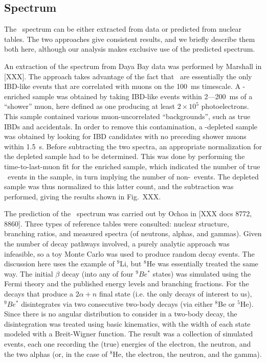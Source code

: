 \documentclass[../thesis.tex]{subfiles}
\begin{document}
\subsection{Spectrum}
\label{sec:bkgLi9Spectrum}

The \LiHe\ spectrum can be either extracted from data or predicted from nuclear tables. The two approaches give consistent results, and we briefly describe them both here, although our analysis makes exclusive use of the predicted spectrum.

An extraction of the spectrum from Daya Bay data was performed by Marshall in [XXX]. The approach takes advantage of the fact that \LiHe\ are essentially the only IBD-like events that are correlated with muons on the 100~ms timescale. A \LiHe-enriched sample was obtained by taking IBD-like events within 2---200~ms of a ``shower'' muon, here defined as one producing at least $2\times10^5$ photoelectrons. This sample contained various muon-uncorrelated ``backgrounds'', such as true IBDs and accidentals. In order to remove this contamination, a \LiHe-depleted sample was obtained by looking for IBD candidates with no preceding shower muons within 1.5~s. Before subtracting the two spectra, an appropriate normalization for the depleted sample had to be determined. This was done by performing the time-to-last-muon fit for the enriched sample, which indicated the number of true \LiHe\ events in the sample, in turn implying the number of non-\LiHe\ events. The depleted sample was thus normalized to this latter count, and the subtraction was performed, giving the results shown in Fig.~XXX.

The prediction of the \LiHe\ spectrum was carried out by Ochoa in [XXX docs 8772, 8860]. Three types of reference tables were consulted: nuclear structure, branching ratios, and measured spectra (of neutrons, alphas, and gammas). Given the number of decay pathways involved, a purely analytic approach was infeasible, so a toy Monte Carlo was used to produce random decay events. The discussion here uses the example of $^9$Li, but $^8$He was essentially treated the same way. The initial $\beta$ decay (into any of four $^9Be^*$ states) was simulated using the Fermi theory and the published energy levels and branching fractions. For the decays that produce a $2\alpha+n$ final state (i.e. the only decays of interest to us), $^9Be^*$ disintegrates via two consecutive two-body decays (via either $^8$Be or $^5$He). Since there is no angular distribution to consider in a two-body decay, the disintegration was treated using basic kinematics, with the width of each state modeled with a Breit-Wigner function. The result was a collection of simulated events, each one recording the (true) energies of the electron, the neutron, and the two alphas (or, in the case of $^8$He, the electron, the neutron, and the gamma).
\end{document}

